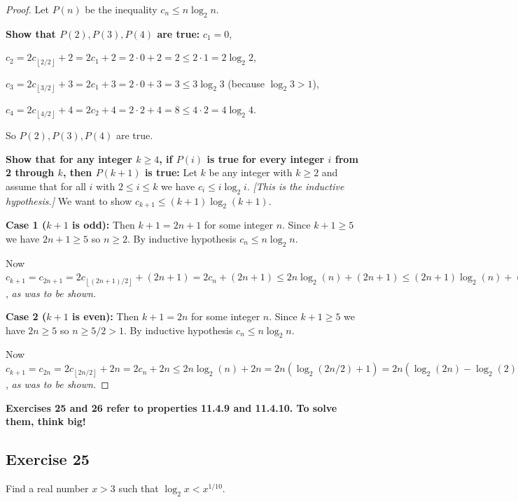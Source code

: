\documentclass[14pt]{extarticle}
\newcommand{\cy}{\color{cyan}}
\newcommand{\floor}[1]{{\left\lfloor#1\right\rfloor}}
\begin{document}
\begin{proof}
Let \(P(n)\) be the inequality \(c_n \leq n \log_2 n\).

{\bf Show that \(P(2), P(3), P(4)\) are true:} \(c_1 = 0\), 

\(c_2 = 2c_{\floor{2/2}} + 2 = 2c_1+ 2 = 2 \cdot 0 + 2 = 2 \leq 2 \cdot 1 = 2 \log_2 2\),

\(c_3 = 2c_{\floor{3/2}} + 3 = 2c_1 + 3 = 2 \cdot 0 + 3 = 3 \leq 3 \log_2 3\) (because \(\log_2 3 > 1\)),

\(c_4 = 2c_{\floor{4/2}} + 4 = 2c_2 + 4 = 2 \cdot 2 + 4 = 8 \leq 4 \cdot 2 = 4 \log_2 4\). 

So \(P(2), P(3), P(4)\) are true.

{\bf Show that for any integer \(k \geq 4\), if \(P(i)\) is true for every integer \(i\) from 2 through \(k\), then 
\(P(k + 1)\) is true:} Let \(k\) be any integer with \(k \geq 2\) and assume that for all \(i\) with \(2 \leq i \leq k\) we
have \(c_i \leq i \log_2 i\). {\it [This is the inductive hypothesis.]} We want to show \(c_{k+1}\leq(k+1)\log_2(k+1)\).

{\bf Case 1 (\(k+1\) is odd):} Then \(k+1 = 2n+1\) for some integer \(n\). Since \(k+1 \geq 5\) we have \(2n+1 \geq 5\) so
\(n \geq 2\). By inductive hypothesis \(c_n \leq n \log_2 n\).

Now \(c_{k+1} = c_{2n+1} = 2c_{\floor{(2n+1)/2}} + (2n+1) = 2c_n + (2n+1) \leq 2n \log_2(n) + (2n+1) \leq (2n+1) 
\log_2(n) + (2n+1) = (2n+1)(\log_2(n) + 1) \leq (2n+1)(\log_2(n+\frac{1}{2}) + 1) = (2n+1)(\log_2((2n+1)/2) + 1)
= (2n+1)(\log_2(2n+1) - \log_2(2) + 1) = (2n+1)(\log_2(2n+1) - 1 + 1) = (2n+1)\log_2(2n+1) = (k+1)\log_2(k+1)\), 
{\it as was to be shown.}

{\bf Case 2 (\(k+1\) is even):} Then \(k+1 = 2n\) for some integer \(n\). Since \(k+1 \geq 5\) we have \(2n \geq 5\) so
\(n \geq 5/2 > 1\). By inductive hypothesis \(c_n \leq n \log_2 n\).

Now \(c_{k+1} = c_{2n} = 2c_{\floor{2n/2}} + 2n = 2c_n + 2n \leq 2n \log_2(n) + 2n = 2n(\log_2(2n/2) + 1) = 2n(\log_2(2n)
- \log_2(2) + 1) = 2n \log_2(2n) = (k+1)\log_2(k+1)\), {\it as was to be shown.}
\end{proof}

{\bf \cy Exercises 25 and 26 refer to properties 11.4.9 and 11.4.10. To solve them, think big!}

\subsection{Exercise 25}
Find a real number \(x > 3\) such that \(\log_2 x < x^{1/10}\).
\end{document}
